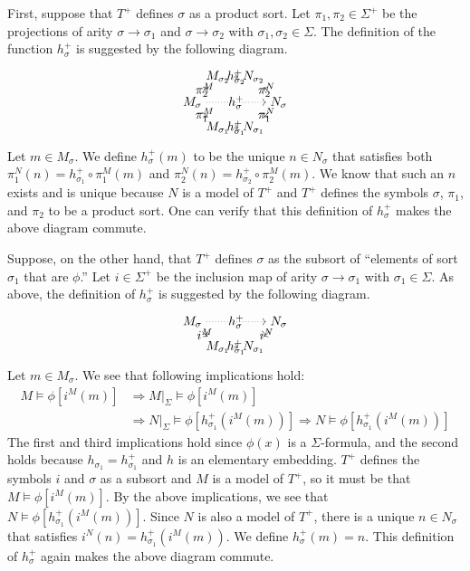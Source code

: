First, suppose that $T^+$ defines $\sigma$ as a product sort. Let
$\pi_1,\pi_2\in\Sigma^+$ be the projections of arity
$\sigma\rightarrow\sigma_1$ and $\sigma\rightarrow\sigma_2$ with
$\sigma_1,\sigma_2\in\Sigma$. The definition of the function
$h^+_\sigma$ is suggested by the following diagram.
\[ \begin{tikzpicture} 
   \node(1) {$M_\sigma$};
   \node(2) [below right of=1] {$M_{\sigma_1}$};
   \node(3) [right of =2] {$N_{\sigma_1}$};
   \node(4) [above right of=3] {$N_{\sigma}$};
   \node(5) [above right of=1] {$M_{\sigma_2}$};
   \node(6) [right of=5] {$N_{\sigma_2}$};
   \draw[->, dotted] (1) to node {$h^+_\sigma$} (4);
   \draw[->] (1) to node [swap] {$\pi_1^M$} (2);
   \draw[->] (2) to node {$h^+_{\sigma_1}$} (3);
   \draw[->] (4) to node {$\pi_1^N$} (3);
   \draw[->] (1) to node {$\pi_2^M$} (5);
   \draw[->] (5) to node {$h^+_{\sigma_2}$} (6);
   \draw[->] (4) to node [swap] {$\pi_2^N$} (6);
\end{tikzpicture} \] Let $m\in M_\sigma$. We define $h^+_\sigma(m)$ to
be the unique $n\in N_\sigma$ that satisfies both
$\pi_1^N(n)=h^+_{\sigma_1}\circ\pi_1^M(m)$ and
$\pi_2^N(n)=h^+_{\sigma_2}\circ\pi_2^M(m)$. We know that such an $n$
exists and is unique because $N$ is a model of $T^+$ and $T^+$ defines
the symbols $\sigma$, $\pi_1$, and $\pi_2$ to be a product sort. One
can verify that this definition of $h^+_\sigma$ makes the above
diagram commute.

Suppose, on the other hand, that $T^+$ defines $\sigma$ as the subsort
of ``elements of sort $\sigma_1$ that are $\phi$.'' Let $i\in\Sigma^+$
be the inclusion map of arity $\sigma\rightarrow\sigma_1$ with
$\sigma_1\in\Sigma$. As above, the definition of $h^+_\sigma$ is
suggested by the following diagram.
\[ \begin{tikzpicture}
\node(1) {$M_\sigma$};
\node(2) [below right of=1] {$M_{\sigma_1}$};
\node(3) [right of =2] {$N_{\sigma_1}$};
\node(4) [above right of=3] {$N_{\sigma}$};
\draw[->, dotted] (1) to node  {$h^+_\sigma$} (4);
\draw[->] (1) to node [swap] {$i^M$} (2);
\draw[->] (2) to node {$h^+_{\sigma_1}$} (3);
\draw[->] (4) to node {$i^N$} (3);
\end{tikzpicture} \]
Let $m\in M_\sigma$. We see that following implications hold:
\begin{align*}
M\vDash\phi[i^M(m)]&\Rightarrow M|_\Sigma\vDash\phi[i^M(m)]\\
&\Rightarrow N|_\Sigma\vDash\phi[h^+_{\sigma_1}( i^M(m))]\Rightarrow N\vDash\phi[h^+_{\sigma_1}( i^M(m))]
\end{align*}
The first and third implications hold since $\phi(x)$ is a
$\Sigma$-formula, and the second holds because
$h_{\sigma_1}=h^+_{\sigma_1}$ and $h$ is an elementary
embedding. $T^+$ defines the symbols $i$ and $\sigma$ as a subsort and
$M$ is a model of $T^+$, so it must be that $M\vDash \phi[i^M(m)]$. By
the above implications, we see that
$N\vDash\phi[h^+_{\sigma_1}( i^M(m))]$. Since $N$ is also a model of
$T^+$, there is a unique $n\in N_\sigma$ that satisfies
$i^N(n)=h^+_{\sigma_1}(i^M(m))$. We define $h^+_\sigma(m)=n$. This
definition of $h^+_\sigma$ again makes the above diagram commute.

